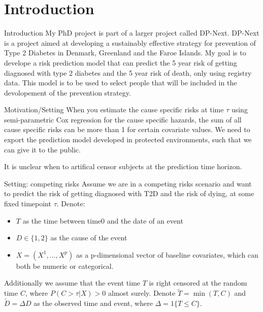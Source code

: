 \documentclass{beamer}\usepackage{listings}
\institute{}
\subtitle{}
\author{Hjalte Søberg Mikkelsen}
\date{}
\title{}
\begin{document}
\section{Introduction}
\label{sec:orga5f6a42}
\begin{frame}[label={sec:org581a002}]{Introduction}
My PhD project is part of a larger project called DP-Next. DP-Next is a project aimed at developing a sustainably effective strategy for prevention of Type 2 Diabetes in Denmark, Greenland and the Faroe Islands.
\vfill
My goal is to develope a risk prediction model that can predict the 5 year risk of getting diagnosed with type 2 diabetes and the 5 year risk of death, only using registry data. This model is to be used to select people that will be included in the devolopement of the prevention strategy. 
\end{frame}


\begin{frame}[label={sec:orgeed6438}]{Motivation/Setting}
When you estimate the cause specific risks at time \(\tau\) using semi-parametric Cox regression for the cause specific hazards, the sum of all cause specific risks can be more than 1 for certain covariate values.
\vfill
We need to export the prediction model developed in protected environments, such that we can give it to the public.
\vfill

It is unclear when to artifical censor subjects at the prediction time horizon.
\end{frame}

\begin{frame}[label={sec:org89b2e31}]{Setting: competing risks}
Assume we are in a competing risks scenario and want to predict the risk of getting diagnosed with T2D and the risk of dying, at some fixed timepoint \(\tau\). Denote:
\vfill
\begin{itemize}
\item \(T\) as the time between time0 and the date of an event
\item \(D\in\{1,2\}\) as the cause of the event
\item \(X = (X^1,...,X^p)\) as a p-dimensional vector of baseline covariates, which can both be numeric or categorical.
\end{itemize}
\vfill
Additionally we assume that the event time \(T\) is right censored at the random time \(C\), where \(P(C>\tau\vert X)>0\) almost surely. Denote \(\tilde{T} = \min(T,C)\) and \(\tilde{D} = \Delta D\) as the observed time and event, where \(\Delta = 1\{T\leq C\}\).
\end{frame}
\end{document}
